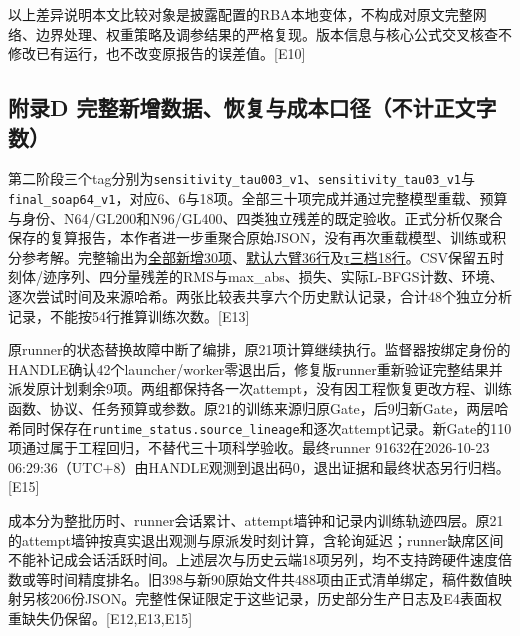 \documentclass[11pt,a4paper]{article}
\begin{document}
以上差异说明本文比较对象是披露配置的RBA本地变体，不构成对原文完整网络、边界处理、权重策略及调参结果的严格复现。版本信息与核心公式交叉核查不修改已有运行，也不改变原报告的误差值。{[}E10{]}

\subsection{附录D 完整新增数据、恢复与成本口径（不计正文字数）}\label{ux9644ux5f55d-ux5b8cux6574ux65b0ux589eux6570ux636eux6062ux590dux4e0eux6210ux672cux53e3ux5f84ux4e0dux8ba1ux6b63ux6587ux5b57ux6570}

第二阶段三个tag分别为\texttt{sensitivity\_\allowbreak{}tau003\_\allowbreak{}v1}、\texttt{sensitivity\_\allowbreak{}tau03\_\allowbreak{}v1}与\texttt{final\_\allowbreak{}soap64\_\allowbreak{}v1}，对应6、6与18项。全部三十项完成并通过完整模型重载、预算与身份、N64/GL200和N96/GL400、四类独立残差的既定验收。正式分析仅聚合保存的复算报告，本作者进一步重聚合原始JSON，没有再次重载模型、训练或积分参考解。完整输出为\href{E:/PINN-PDE/自主研究/当前主线/round33_equation_screen/validation/stage6_analysis_20261022/complete_v2/all_new_runs.csv}{全部新增30项}、\href{E:/PINN-PDE/自主研究/当前主线/round33_equation_screen/validation/stage6_analysis_20261022/complete_v2/default_six_arms.csv}{默认六臂36行}及\href{E:/PINN-PDE/自主研究/当前主线/round33_equation_screen/validation/stage6_analysis_20261022/complete_v2/tau_sensitivity.csv}{τ三档18行}。CSV保留五时刻体/迹序列、四分量残差的RMS与max\_\allowbreak{}abs、损失、实际L-BFGS计数、环境、逐次尝试时间及来源哈希。两张比较表共享六个历史默认记录，合计48个独立分析记录，不能按54行推算训练次数。{[}E13{]}

原runner的状态替换故障中断了编排，原21项计算继续执行。监督器按绑定身份的HANDLE确认42个launcher/worker零退出后，修复版runner重新验证完整结果并派发原计划剩余9项。两组都保持各一次attempt，没有因工程恢复更改方程、训练函数、协议、任务预算或参数。原21的训练来源归原Gate，后9归新Gate，两层哈希同时保存在\texttt{runtime\_\allowbreak{}status.source\_\allowbreak{}lineage}和逐次attempt记录。新Gate的110项通过属于工程回归，不替代三十项科学验收。最终runner 91632在2026-10-23 06:29:36（UTC+8）由HANDLE观测到退出码0，退出证据和最终状态另行归档。{[}E15{]}

成本分为整批历时、runner会话累计、attempt墙钟和记录内训练轨迹四层。原21的attempt墙钟按真实退出观测与原派发时刻计算，含轮询延迟；runner缺席区间不能补记成会话活跃时间。上述层次与历史云端18项另列，均不支持跨硬件速度倍数或等时间精度排名。旧398与新90原始文件共488项由正式清单绑定，稿件数值映射另核206份JSON。完整性保证限定于这些记录，历史部分生产日志及E4表面权重缺失仍保留。{[}E12,E13,E15{]}
\end{document}
